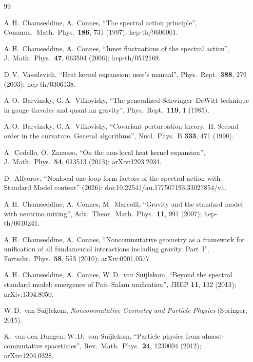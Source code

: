 \documentclass[twocolumn,10pt]{article}
\begin{document}
\begin{thebibliography}{99}

A.\,H.~Chamseddine, A.~Connes,
``The spectral action principle'',
Commun.\ Math.\ Phys.\ \textbf{186}, 731 (1997);
hep-th/9606001.

A.\,H.~Chamseddine, A.~Connes,
``Inner fluctuations of the spectral action'',
J.\ Math.\ Phys.\ \textbf{47}, 063504 (2006);
hep-th/0512169.

D.\,V.~Vassilevich,
``Heat kernel expansion: user's manual'',
Phys.\ Rept.\ \textbf{388}, 279 (2003);
hep-th/0306138.

A.\,O.~Barvinsky, G.\,A.~Vilkovisky,
``The generalized Schwinger--DeWitt technique in gauge theories
and quantum gravity'',
Phys.\ Rept.\ \textbf{119}, 1 (1985).

A.\,O.~Barvinsky, G.\,A.~Vilkovisky,
``Covariant perturbation theory.~II. Second order in the
curvature. General algorithms'',
Nucl.\ Phys.\ B \textbf{333}, 471 (1990).

A.~Codello, O.~Zanusso,
``On the non-local heat kernel expansion'',
J.\ Math.\ Phys.\ \textbf{54}, 013513 (2013);
arXiv:1203.2034.

D.~Alfyorov,
``Nonlocal one-loop form factors of the spectral action
with Standard Model content'' (2026);
doi:10.22541/au.177507193.33027854/v1.

A.\,H.~Chamseddine, A.~Connes, M.~Marcolli,
``Gravity and the standard model with neutrino mixing'',
Adv.\ Theor.\ Math.\ Phys.\ \textbf{11}, 991 (2007);
hep-th/0610241.

A.\,H.~Chamseddine, A.~Connes,
``Noncommutative geometry as a framework for unification of
all fundamental interactions including gravity. Part~I'',
Fortschr.\ Phys.\ \textbf{58}, 553 (2010);
arXiv:0901.0577.

A.\,H.~Chamseddine, A.~Connes, W.\,D.~van Suijlekom,
``Beyond the spectral standard model: emergence of
Pati--Salam unification'',
JHEP \textbf{11}, 132 (2013);
arXiv:1304.8050.

W.\,D.~van Suijlekom,
\textit{Noncommutative Geometry and Particle Physics}
(Springer, 2015).

K.~van den Dungen, W.\,D.~van Suijlekom,
``Particle physics from almost-commutative spacetimes'',
Rev.\ Math.\ Phys.\ \textbf{24}, 1230004 (2012);
arXiv:1204.0328.


\end{thebibliography}
\end{document}
